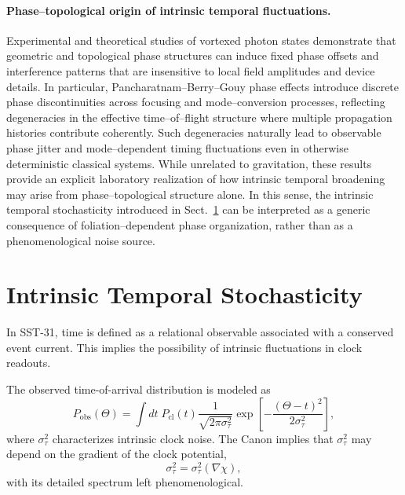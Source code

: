 \documentclass[11pt]{article}
\begin{document}
            \paragraph{Phase--topological origin of intrinsic temporal fluctuations.}
                Experimental and theoretical studies of vortexed photon states demonstrate that
                geometric and topological phase structures can induce fixed phase offsets and
                interference patterns that are insensitive to local field amplitudes and device
                details. In particular, Pancharatnam--Berry--Gouy phase effects introduce discrete
                phase discontinuities across focusing and mode--conversion processes, reflecting
                degeneracies in the effective time--of--flight structure where multiple propagation
                histories contribute coherently. Such degeneracies naturally lead to observable
                phase jitter and mode--dependent timing fluctuations even in otherwise
                deterministic classical systems. While unrelated to gravitation, these results
                provide an explicit laboratory realization of how intrinsic temporal broadening
                may arise from phase--topological structure alone. In this sense, the intrinsic
                temporal stochasticity introduced in Sect.~\ref{sec:intrinsic_time} can be interpreted as a generic
                consequence of foliation--dependent phase organization, rather than as a
                phenomenological noise source.

    \section{Intrinsic Temporal Stochasticity}
    \label{sec:intrinsic_time}

        In SST-31, time is defined as a relational observable associated with a conserved
        event current.
        This implies the possibility of intrinsic fluctuations in clock readouts.

        The observed time-of-arrival distribution is modeled as
        \begin{equation}
            P_{\mathrm{obs}}(\Theta)
            =
            \int dt\;
            P_{\mathrm{cl}}(t)
            \frac{1}{\sqrt{2\pi\sigma_\tau^2}}
            \exp\!\left[-\frac{(\Theta-t)^2}{2\sigma_\tau^2}\right],
        \end{equation}
        where $\sigma_\tau^2$ characterizes intrinsic clock noise.
        The Canon implies that $\sigma_\tau^2$ may depend on the gradient of the clock
        potential,
        \begin{equation}
            \sigma_\tau^2 = \sigma_\tau^2(\nabla \chi),
        \end{equation}
        with its detailed spectrum left phenomenological.
\end{document}
